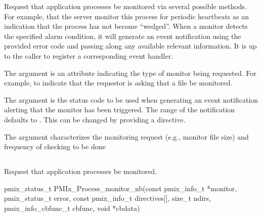 
\optattrend

\descr

Request that application processes be monitored via several possible methods.
For example, that the server monitor this process for periodic heartbeats as an indication that the process has not become ``wedged''.
When a monitor detects the specified alarm condition, it will generate an event notification using the provided error code and passing along any available relevant information.
It is up to the caller to register a corresponding event handler.

The  argument is an attribute indicating the type of monitor being requested.
For example,  to indicate that the requestor is asking that a file be monitored.

The  argument is the status code to be used when generating an event notification alerting that the monitor has been triggered.
The range of the notification defaults to .
This can be changed by providing a  directive.

The  argument characterizes the monitoring request (e.g., monitor file size) and frequency of checking to be done


\subsection{}

\summary

Request that application processes be monitored.

\format

\cspecificstart
\begin{codepar}
pmix_status_t
PMIx_Process_monitor_nb(const pmix_info_t *monitor, pmix_status_t error,
                        const pmix_info_t directives[], size_t ndirs,
                        pmix_info_cbfunc_t cbfunc, void *cbdata)
\end{codepar}
\cspecificend

